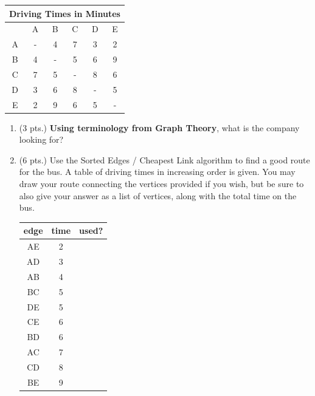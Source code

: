 \documentclass[12pt]{article}
\begin{document}
\begin{enumerate}
\begin{center}
\begin{tabular}{|c||c|c|c|c|c|}
\multicolumn{6}{c}{Driving Times in Minutes}\\
\hline
& {A} & {B} & {C} & {D} & {E} \\
\hline\hline
{A} & - & 4 & 7 & 3 & 2 \\
\hline
{B} & 4 & - & 5 & 6 & 9 \\
\hline
{C} & 7 & 5 & - & 8 & 6 \\
\hline
{D} & 3 & 6 & 8 & - & 5 \\
\hline
{E} & 2 & 9 & 6 & 5 & - \\
\hline
\end{tabular}
\end{center}

\begin{enumerate}
\item (3 pts.) \textbf{Using terminology from Graph Theory}, what is the company looking for?
\item (6 pts.)
Use the Sorted Edges / Cheapest Link algorithm to find a good route for the bus. A table of driving times in increasing order is given. You may draw your route connecting the vertices provided if you wish, but be sure to also give your answer as a list of vertices, along with the total time on the bus.
\vspace{0.5cm}
\begin{center}
\begin{minipage}{2.in}
    \end{minipage}
\hspace{1.cm}
\begin{minipage}{2.in}
\begin{tabular}{|c|c|c|}
\hline
edge& time &used?\\
\hline\hline
AE& 2&\\
\hline
AD&3&\\
\hline
AB&4&\\
\hline
BC&5&\\
\hline
DE&5&\\
\hline
CE&6&\\
\hline
BD&6&\\
\hline
AC&7&\\
\hline
CD&8&\\
\hline
BE&9&\\
\hline
\end{tabular}
\end{minipage}
 \end{center}
 

\end{enumerate}
\end{enumerate}
\end{document}
